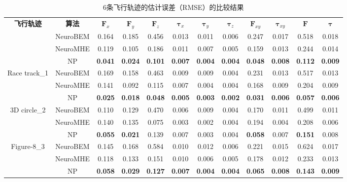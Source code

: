 \documentclass[lang=chs, degree=master, blindreview=false, winfonts=true]{yanputhesis}
\begin{document}
\renewcommand\arraystretch{1.15}  %
\begin{table}[h]
\centering
\caption{6条飞行轨迹的估计误差（RMSE）的比较结果}
\label{table_bem}
\setlength{\tabcolsep}{4pt}  %
\begin{tabular}{c c c c c c c c c c c c}
	\Xhline{1.pt}
	\textbf{飞行轨迹} & \textbf{算法} & $\bm F_x$ & $\bm F_y$ & $\bm F_z$ & $\bm \tau_x$ & $\bm \tau_y$ & $\bm \tau_z$ & $\bm F_{xy}$ & $\bm \tau_{xy}$ & $\bm F$ & $\bm \tau$ \\
	\Xhline{1.pt}
	\multirow{3}{*}{Linear oscillation} & NeuroBEM & 0.164 & 0.185 & 0.456 & 0.013 & 0.011 & 0.006 & 0.247 & 0.017 & 0.518 & 0.018 \\
	& NeuroMHE & 0.119 & 0.105 & 0.186 & 0.011 & 0.007 & 0.005 & 0.159 & 0.013 & 0.244 & 0.014 \\
	& NP & \textbf{0.041} & \textbf{0.024} & \textbf{0.101} & \textbf{0.007} & \textbf{0.004} & \textbf{0.004} & \textbf{0.048} & \textbf{0.008} & \textbf{0.112} & \textbf{0.009} \\
	\hline
	\multirow{3}{*}{Race track\_1} & NeuroBEM & 0.169 & 0.158 & 0.463 & 0.009 & 0.009 & 0.004 & 0.231 & 0.013 & 0.517 & 0.013 \\
	& NeuroMHE & 0.141 & 0.092 & 0.115 & 0.007 & 0.004 & 0.004 & 0.168 & 0.009 & 0.204 & 0.009 \\
	& NP & \textbf{0.025} & \textbf{0.018} & \textbf{0.048} & \textbf{0.005} & \textbf{0.003} & \textbf{0.002} & \textbf{0.031} & \textbf{0.006} & \textbf{0.057} & \textbf{0.006} \\
	\hline
	\multirow{3}{*}{3D circle\_2} & NeuroBEM & 0.110 & 0.129 & 0.470 & 0.006 & 0.009 & 0.004 & 0.170 & 0.011 & 0.499 & 0.011 \\
	& NeuroMHE & 0.140 & 0.135 & 0.075 & 0.003 & 0.002 & 0.004 & 0.194 & 0.004 & 0.208 & 0.006 \\
	& NP & \textbf{0.055} & \textbf{0.021} & 0.139 & 0.007 & 0.003 & 0.004 & \textbf{0.058} & 0.007 & \textbf{0.151} & 0.008 \\
	\hline
	\multirow{3}{*}{Figure-8\_3} & NeuroBEM & 0.145 & 0.168 & 0.584 & 0.010 & 0.012 & 0.006 & 0.221 & 0.015 & 0.624 & 0.017 \\
	& NeuroMHE & 0.118 & 0.133 & 0.151 & 0.010 & 0.006 & 0.005 & 0.178 & 0.012 & 0.233 & 0.013 \\
	& NP & \textbf{0.058} & \textbf{0.029} & \textbf{0.127} & \textbf{0.007} & \textbf{0.004} & \textbf{0.004} & \textbf{0.065} & \textbf{0.008} & \textbf{0.143} & \textbf{0.009} \\

\end{tabular}
\end{table}
\end{document}
